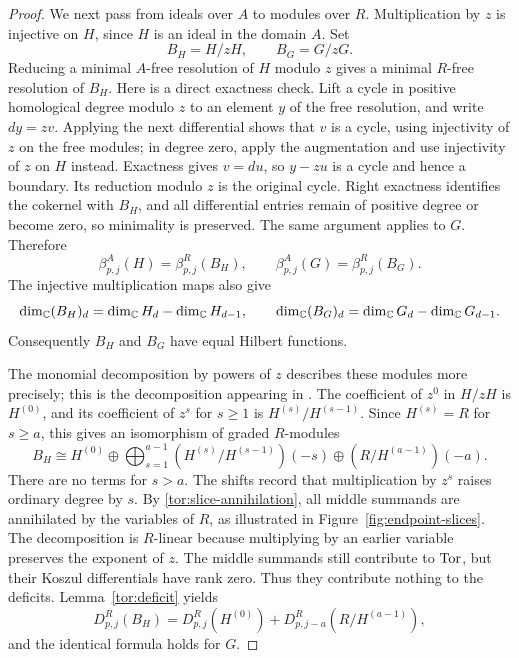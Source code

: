 \begin{proof}
We next pass from ideals over $A$ to modules over $R$.  Multiplication
by $z$ is injective on $H$, since $H$ is an ideal in the domain $A$.
Set
\[
 B_H=H/zH,\qquad B_G=G/zG.
\]
Reducing a minimal $A$-free resolution of $H$ modulo $z$ gives a
minimal $R$-free resolution of $B_H$.  Here is a direct exactness
check.  Lift a cycle in positive homological degree modulo $z$ to
an element $y$ of the free resolution, and write $dy=zv$.
Applying the next differential shows that $v$ is a cycle, using
injectivity of $z$ on the free modules; in degree zero, apply the
augmentation and use injectivity of $z$ on $H$ instead.
Exactness gives $v=du$, so $y-zu$ is a cycle and hence a boundary.
Its reduction modulo $z$ is the original cycle.  Right exactness
identifies the cokernel with $B_H$, and all differential entries
remain of positive degree or become zero, so minimality is preserved.
The same argument applies to $G$.  Therefore
\begin{equation}
\label{tor:reduction}
 \beta^A_{p,j}(H)=\beta^R_{p,j}(B_H),\qquad
 \beta^A_{p,j}(G)=\beta^R_{p,j}(B_G).
\end{equation}
The injective multiplication maps also give
\[
 \dim_\mathbb C(B_H)_d=\dim_\mathbb C H_d-\dim_\mathbb C H_{d-1},\qquad
 \dim_\mathbb C(B_G)_d=\dim_\mathbb C G_d-\dim_\mathbb C G_{d-1}.
\]
Consequently $B_H$ and $B_G$ have equal Hilbert functions.

The monomial decomposition by powers of $z$ describes these modules
more precisely; this is the decomposition appearing in
\cite[Lemma~3.7]{CS}.  The coefficient of $z^0$ in $H/zH$ is $H^{(0)}$,
and its coefficient of $z^s$ for $s\ge1$ is
$H^{(s)}/H^{(s-1)}$.  Since $H^{(s)}=R$ for $s\ge a$, this gives
an isomorphism of graded $R$-modules
\begin{equation}
\label{tor:slice-decomposition}
 B_H\cong H^{(0)}
       \oplus\bigoplus_{s=1}^{a-1}
             (H^{(s)}/H^{(s-1)})(-s)
       \oplus(R/H^{(a-1)})(-a).
\end{equation}
There are no terms for $s>a$.  The shifts record that multiplication
by $z^s$ raises ordinary degree by $s$.  By
\eqref{tor:slice-annihilation}, all middle summands are annihilated
by the variables of $R$, as illustrated in
Figure~\ref{fig:endpoint-slices}. The decomposition is $R$-linear
because multiplying by an earlier variable preserves the exponent of
$z$. The middle summands still contribute to $\operatorname{Tor}$, but their
Koszul differentials have rank zero. Thus they contribute nothing to
the deficits. Lemma~\ref{tor:deficit} yields
\begin{equation}
\label{tor:endpoint-deficits}
 D^R_{p,j}(B_H)
   =D^R_{p,j}(H^{(0)})
      +D^R_{p,j-a}(R/H^{(a-1)}),
\end{equation}
and the identical formula holds for $G$.


\end{proof}
